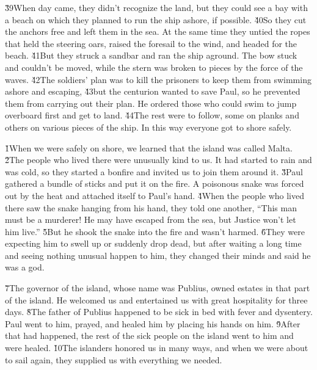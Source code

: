 \v{39}When day came, they didn't recognize the land, but they could see a bay with a beach on which they planned to run the ship ashore, if possible. \v{40}So they cut the anchors free and left them in the sea. At the same time they untied the ropes that held the steering oars, raised the foresail to the wind, and headed for the beach. \v{41}But they struck a sandbar and ran the ship aground. The bow stuck and couldn't be moved, while the stern was broken to pieces by the force of the waves. \v{42}The soldiers' plan was to kill the prisoners to keep them from swimming ashore and escaping, \v{43}but the centurion wanted to save Paul, so he prevented them from carrying out their plan. He ordered those who could swim to jump overboard first and get to land. \v{44}The rest were to follow, some on planks and others on various pieces of the ship. In this way everyone got to shore safely.

\v{1}When we were safely on shore, we learned that the island was called Malta. \v{2}The people who lived there were unusually kind to us. It had started to rain and was cold, so they started a bonfire and invited us to join them around it. \v{3}Paul gathered a bundle of sticks and put it on the fire. A poisonous snake was forced out by the heat and attached itself to Paul's hand. \v{4}When the people who lived there saw the snake hanging from his hand, they told one another, ``This man must be a murderer! He may have escaped from the sea, but Justice won't let him live.'' \v{5}But he shook the snake into the fire and wasn't harmed. \v{6}They were expecting him to swell up or suddenly drop dead, but after waiting a long time and seeing nothing unusual happen to him, they changed their minds and said he was a god.

\v{7}The governor of the island, whose name was Publius, owned estates in that part of the island. He welcomed us and entertained us with great hospitality for three days. \v{8}The father of Publius happened to be sick in bed with fever and dysentery. Paul went to him, prayed, and healed him by placing his hands on him. \v{9}After that had happened, the rest of the sick people on the island went to him and were healed. \v{10}The islanders honored us in many ways, and when we were about to sail again, they supplied us with everything we needed.

